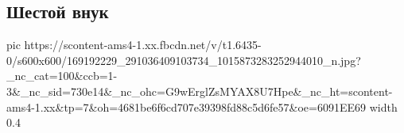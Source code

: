  
 
 
 
 

\subsection{Шестой внук}
\label{sec:05_04_2021.fb.georgii_protoierej.1.shestoj_vnuk}

\ifcmt
  pic https://scontent-ams4-1.xx.fbcdn.net/v/t1.6435-0/s600x600/169192229_291036409103734_1015873283252944010_n.jpg?_nc_cat=100&ccb=1-3&_nc_sid=730e14&_nc_ohc=G9wErglZsMYAX8U7Hpe&_nc_ht=scontent-ams4-1.xx&tp=7&oh=4681be6f6cd707e39398fd88c5d6fe57&oe=6091EE69
  width 0.4
\fi

